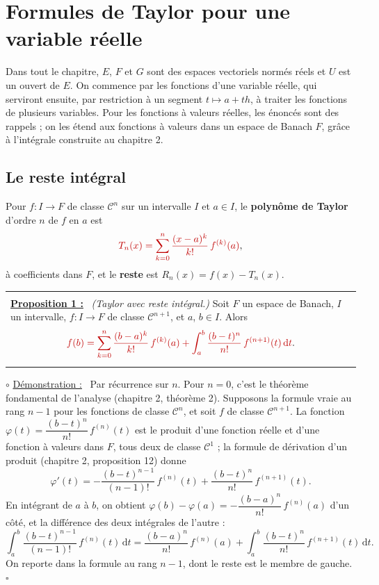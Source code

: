 \documentclass[a4paper,twoside]{report}
\makeatletter
\newcommand{\mot}[1]{\textcolor{rougecours}{\textbf{#1}}}
\newcommand{\rmath}[1]{\textcolor{rougecours}{#1}}
\newenvironment{cadre}%
 {\par\vspace{2mm}\noindent\begin{tabular}{|@{\hspace{4mm}}p{0.93\textwidth}@{\hspace{4mm}}|}
  \hline \\[-2mm]}%
 {\\[2mm] \hline \end{tabular}\par\vspace{3mm}}
\newcommand{\propo}[1]{\textbf{\underline{Proposition #1 :}}~}
\newenvironment{demo}%
 {\par\needspace{4\baselineskip}\vspace{1mm}\noindent$\circ$ \underline{Démonstration :}~\setlength{\parskip}{3pt plus 1pt}}%
 {\hfill$\square$\par\vspace{2mm}}
\newcommand{\dd}{\mathrm{d}}                      %
\newcommand{\Cc}{\mathcal{C}}                     %
\makeatother
\begin{document}
\section[Taylor, une variable]{Formules de Taylor pour une variable réelle}

Dans tout le chapitre, $E$, $F$ et $G$ sont des espaces vectoriels normés réels et $U$ est un ouvert de $E$. On commence par les fonctions d'une variable réelle, qui serviront ensuite, par restriction à un segment $t \mapsto a + th$, à traiter les fonctions de plusieurs variables. Pour les fonctions à valeurs réelles, les énoncés sont des rappels ; on les étend aux fonctions à valeurs dans un espace de Banach $F$, grâce à l'intégrale construite au chapitre 2.

\subsection{Le reste intégral}

Pour $f : I \to F$ de classe $\Cc^{n}$ sur un intervalle $I$ et $a \in I$, le \mot{polynôme de Taylor} d'ordre $n$ de $f$ en $a$ est
\[ \rmath{T_{n}(x) = \sum_{k = 0}^{n} \frac{(x - a)^{k}}{k!}\,f^{(k)}(a)}, \]
à coefficients dans $F$, et le \mot{reste} est $R_{n}(x) = f(x) - T_{n}(x)$.

\begin{cadre}
\propo{1} \emph{(Taylor avec reste intégral.)} Soit $F$ un espace de Banach, $I$ un intervalle, $f : I \to F$ de classe $\Cc^{n + 1}$, et $a$, $b \in I$. Alors
\[ \rmath{f(b) = \sum_{k = 0}^{n} \frac{(b - a)^{k}}{k!}\,f^{(k)}(a) + \int_{a}^{b} \frac{(b - t)^{n}}{n!}\,f^{(n + 1)}(t)\,\dd t}. \]
\end{cadre}

\begin{demo}
Par récurrence sur $n$. Pour $n = 0$, c'est le théorème fondamental de l'analyse (chapitre 2, théorème 2). Supposons la formule vraie au rang $n - 1$ pour les fonctions de classe $\Cc^{n}$, et soit $f$ de classe $\Cc^{n + 1}$. La fonction $\varphi(t) = \dfrac{(b - t)^{n}}{n!}\,f^{(n)}(t)$ est le produit d'une fonction réelle et d'une fonction à valeurs dans $F$, tous deux de classe $\Cc^{1}$ ; la formule de dérivation d'un produit (chapitre 2, proposition 12) donne
\[ \varphi'(t) = -\frac{(b - t)^{n - 1}}{(n - 1)!}\,f^{(n)}(t) + \frac{(b - t)^{n}}{n!}\,f^{(n + 1)}(t). \]
En intégrant de $a$ à $b$, on obtient $\varphi(b) - \varphi(a) = -\dfrac{(b - a)^{n}}{n!}\,f^{(n)}(a)$ d'un côté, et la différence des deux intégrales de l'autre :
\[ \int_{a}^{b} \frac{(b - t)^{n - 1}}{(n - 1)!}\,f^{(n)}(t)\,\dd t = \frac{(b - a)^{n}}{n!}\,f^{(n)}(a) + \int_{a}^{b} \frac{(b - t)^{n}}{n!}\,f^{(n + 1)}(t)\,\dd t. \]
On reporte dans la formule au rang $n - 1$, dont le reste est le membre de gauche.
\end{demo}
\end{document}
